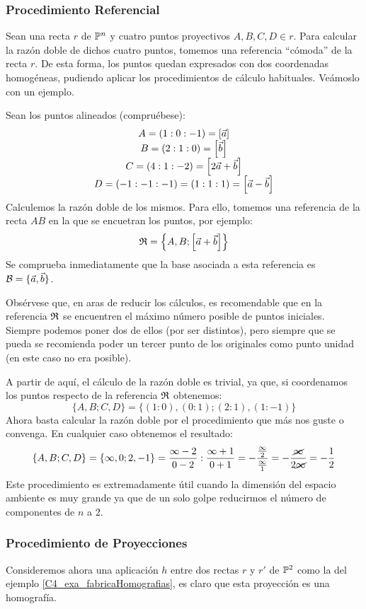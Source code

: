 \subsubsection{Procedimiento Referencial}
Sean una recta $r$ de $\mathbb{P}^n$ y cuatro puntos proyectivos $A,B,C,D\in r$. Para calcular la razón doble de dichos cuatro puntos, tomemos una referencia ``cómoda'' de la recta $r$. De esta forma, los puntos quedan expresados con dos coordenadas homogéneas, pudiendo aplicar los procedimientos de cálculo habituales. Veámoslo con un ejemplo.
\begin{exa}
	\label{C5_exa_puntosAlineados}
	Sean los puntos alineados (compruébese):
	\[\begin{array}{c}
	A=(1:0:-1)=\left [ \vec{a} \right ]\\
	B=(2:1:0)=\left [ \vec{b} \right ]\\
	C=(4:1:-2)=\left [ 2\vec{a}+\vec{b} \right ]\\
	D=(-1:-1:-1)=(1:1:1)=\left [ \vec{a}-\vec{b} \right ]\\
	\end{array}\]
	Calculemos la razón doble de los mismos. Para ello, tomemos una referencia de la recta $AB$ en la que se encuetran los puntos, por ejemplo: \[\mathfrak{R}=\left\{A,B;\left [ \vec{a}+\vec{b} \right ]\right\}\]
	Se comprueba inmediatamente que la base asociada a esta referencia es $\mathcal{B}=\{\vec{a},\vec{b}\}$.
	
	Obsérvese que, en aras de reducir los cálculos, es recomendable que en la referencia $\mathfrak{R}$ se encuentren el máximo número posible de puntos iniciales. Siempre podemos poner dos de ellos (por ser distintos), pero siempre que se pueda se recomienda poder un tercer punto de los originales como punto unidad (en este caso no era posible). 
	
	A partir de aquí, el cálculo de la razón doble es trivial, ya que, si coordenamos los puntos respecto de la referencia $\mathfrak{R}$ obtenemos:
	\[\{A,B;C,D\}=\{(1:0),(0:1);(2:1),(1:-1)\}\]
	Ahora basta calcular la razón doble por el procedimiento que más nos guste o convenga. En cualquier caso obtenemos el resultado:
	\[\{A,B;C,D\}=\{\infty,0;2,-1\}=\frac{\infty-2}{0-2}:\frac{\infty+1}{0+1}=-\frac{\frac{\infty}{2}}{\frac{\infty}{1}}=-\frac{\cancel{\infty}}{2\cancel{\infty}}=-\frac{1}{2}\]
	Este procedimiento es extremadamente útil cuando la dimensión del espacio ambiente es muy grande ya que de un solo golpe reducirmos el número de componentes de $n$ a $2$.
\end{exa}
\subsubsection{Procedimiento de Proyecciones}
Consideremos ahora una aplicación $h$ entre dos rectas $r$ y $r'$ de $\mathbb{P}^2$ como la del ejemplo \ref{C4_exa_fabricaHomografias}, es claro que esta proyección es una homografía.

